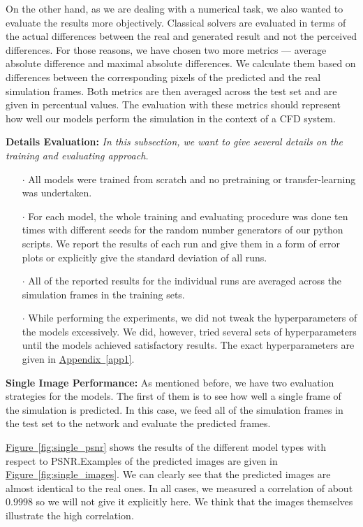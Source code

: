 \documentclass{llncs}
\newcommand{\reffig}[1]{\hyperref[#1]{Figure~\ref*{#1}}}
\newcommand{\refapp}[1]{\hyperref[#1]{Appendix~\ref*{#1}}}
\begin{document}
On the other hand, as we are dealing with a numerical task, we also wanted to evaluate the results more objectively. Classical solvers are evaluated in terms of the actual differences between the real and generated result and not the perceived differences. For those reasons, we have chosen two more metrics --- average absolute difference and maximal absolute differences. We calculate them based on differences between the corresponding pixels of the predicted and the real simulation frames. Both metrics are then averaged across the test set and are given in percentual values. The evaluation with these metrics should represent how well our models perform the simulation in the context of a CFD system.

\noindent\textbf{Details Evaluation:}
\emph{In this subsection, we want to give several details on the training and evaluating approach.}
\begin{itemize}
\item[$\cdot$] All models were trained from scratch and no pretraining or transfer-learning was undertaken.
\item[$\cdot$] For each model, the whole training and evaluating procedure was done ten times with different seeds for the random number generators of our python scripts. We report the results of each run and give them in a form of error plots or explicitly give the standard deviation of all runs.
\item[$\cdot$] All of the reported results for the individual runs are averaged across the simulation frames in the training sets.
\item[$\cdot$] While performing the experiments, we did not tweak the hyperparameters of the models excessively. We did, however, tried several sets of hyperparameters until the models achieved satisfactory results. The exact hyperparameters are given in \refapp{app1}.
\end{itemize}

\noindent\textbf{Single Image Performance:}
As mentioned before, we have two evaluation strategies for the models. The first of them is to see how well a single frame of the simulation is predicted. In this case, we feed all of the simulation frames in the test set to the network and evaluate the predicted frames.

\reffig{fig:single_psnr} shows the results of the different model types with respect to PSNR.\@ Examples of the predicted images are given in \reffig{fig:single_images}. We can clearly see that the predicted images are almost identical to the real ones. In all cases, we measured a correlation of about $0.9998$ so we will not give it explicitly here. We think that the images themselves illustrate the high correlation.
\end{document}
